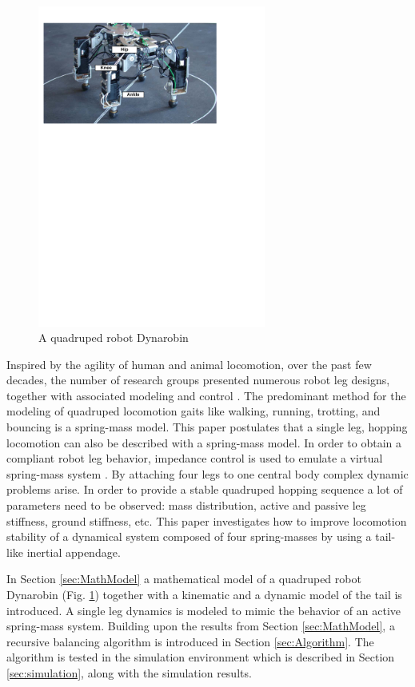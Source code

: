 \begin{figure}
                \centering
                \includegraphics[width=75mm]{./pictures/Dynarobin_introduction_image.pdf}
                \caption{A quadruped robot Dynarobin \cite{DBLP:conf/IEEEcca/MutkaPRK12}}
                \label{fig:Dynarobin}
\end{figure}
 
Inspired by the agility of human and animal locomotion, over the past few decades, the number of research groups presented numerous robot leg designs, together with associated modeling and control \cite{CambridgeJournals:1345088}. The predominant method for the modeling of quadruped locomotion gaits like walking, running, trotting, and bouncing is a spring-mass model\cite{Blickhan01}. This paper postulates that a single leg, hopping locomotion can also be described with a spring-mass model. In order to obtain a compliant robot leg behavior, impedance control is used to emulate a virtual spring-mass system \cite{Havoutis01}. By attaching four legs to one central body complex dynamic problems arise. In order to provide a stable quadruped hopping sequence a lot of parameters need to be observed: mass distribution, active and passive leg stiffness, ground stiffness, etc. This paper investigates how to improve locomotion stability of a dynamical system composed of four spring-masses by using a tail-like inertial appendage.
 
In Section \ref{sec:MathModel} a mathematical model of a quadruped robot Dynarobin (Fig. \ref{fig:Dynarobin}) together with a kinematic and a dynamic model of the tail is introduced. A single leg dynamics is modeled to mimic the behavior of an active spring-mass system. Building upon the results from Section \ref{sec:MathModel}, a recursive balancing algorithm is introduced in Section \ref{sec:Algorithm}. The algorithm is tested in the simulation environment which is described in Section \ref{sec:simulation}, along with the simulation results.




